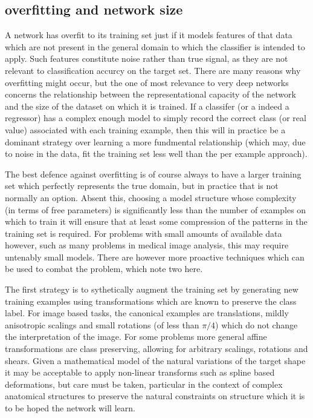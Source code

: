\documentclass[msc]{infthesis}
\begin{document}
\subsection{overfitting and network size}
\label{sec:classification:deep:overfitting}


A network has overfit to its training set just if it models features of that data which are not
present in the general domain to which the classifier is intended to apply.  Such features constitute
noise rather than true signal, as they are not relevant to classification accurcy on the target
set.  There are many reasons why overfitting might occur, but the one of most relevance to very deep
networks concerns the relationship between the representational capacity of the network and the
size of the dataset on which it is trained.  If a classifer (or a indeed a regressor) has a complex
enough model to simply record the correct class (or real value) associated with each training example,
then this will in practice be a dominant strategy over learning a more fundmental relationship (which
may, due to noise in the data, fit the training set less well than the per example approach).

The best defence against overfitting is of course always to have a larger training set which 
perfectly represents the true domain, but in practice that is not normally an option.  Absent this,
choosing a model structure whose complexity (in terms of free parameters) is significantly less
than the number of examples on which to train it will ensure that at least some compression of the
patterns in the training set is required.  For problems with small amounts of available data however,
such as many problems in medical image analysis, this may require untenably small models.  There are
however more proactive techniques which can be used to combat the problem, which note two here.

The first strategy is to sythetically augment the training set by generating new training
examples using transformations which are known to preserve the class label.  For image based
tasks, the canonical examples are translations, mildly anisotropic scalings and small rotations
(of less than \(\pi / 4\)) which do not change the interpretation of the image.  For some
problems more general affine transformations are class preserving, allowing for arbitrary
scalings, rotations and shears.  Given a mathematical model of the natural variations of the
target shape it may be acceptable to apply non-linear transforms such as spline based
deformations, but care must be taken, particular in the context of complex anatomical structures
to preserve the natural constraints on structure which it is to be hoped the network will learn.
\end{document}
